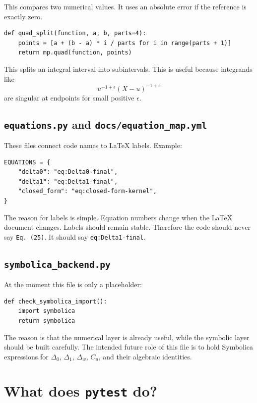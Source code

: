 \documentclass[11pt,a4paper]{article}
\begin{document}
This compares two numerical values. It uses an absolute error if the reference is exactly zero.

\begin{lstlisting}
def quad_split(function, a, b, parts=4):
    points = [a + (b - a) * i / parts for i in range(parts + 1)]
    return mp.quad(function, points)
\end{lstlisting}

This splits an integral interval into subintervals. This is useful because integrands like
\begin{equation}
  u^{-1+\epsilon}(X-u)^{-1+\epsilon}
\end{equation}
are singular at endpoints for small positive \(\epsilon\).

\subsection{\texttt{equations.py} and \texttt{docs/equation\_map.yml}}

These files connect code names to LaTeX labels. Example:
\begin{lstlisting}
EQUATIONS = {
    "delta0": "eq:Delta0-final",
    "delta1": "eq:Delta1-final",
    "closed_form": "eq:closed-form-kernel",
}
\end{lstlisting}

The reason for labels is simple. Equation numbers change when the LaTeX document changes. Labels should remain stable. Therefore the code should never say \texttt{Eq. (25)}. It should say \texttt{eq:Delta1-final}.

\subsection{\texttt{symbolica\_backend.py}}

At the moment this file is only a placeholder:
\begin{lstlisting}
def check_symbolica_import():
    import symbolica
    return symbolica
\end{lstlisting}

The reason is that the numerical layer is already useful, while the symbolic layer should be built carefully. The intended future role of this file is to hold Symbolica expressions for \(\Delta_0\), \(\Delta_1\), \(\Delta_w\), \(C_u\), and their algebraic identities.

\section{What does \texttt{pytest} do?}
\end{document}
